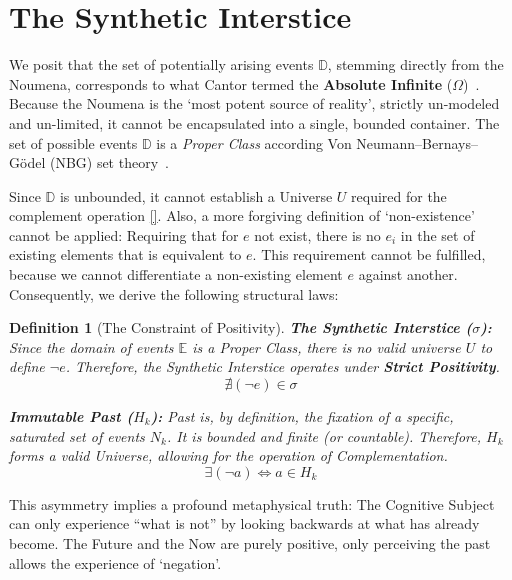 \documentclass[11pt, a4paper]{article}
\theoremstyle{formalism}
\newtheorem{formalism}{Definition}
\begin{document}
\section{The Synthetic Interstice}

We posit that the set of potentially arising events $\mathbb{D}$, stemming
directly from the Noumena, corresponds to what Cantor termed the
\textbf{Absolute Infinite} ($\Omega$)~\cite{Cantor1899}. Because the Noumena is
the `most potent source of reality', strictly un-modeled and un-limited, it
cannot be encapsulated into a single, bounded container. The set of possible
events $\mathbb{D}$ is a {\it Proper Class\/} according Von
Neumann–Bernays–Gödel (NBG) set theory~\cite{VonNeumann1925}.

Since $\mathbb{D}$ is unbounded, it cannot establish a Universe $U$ required
for the complement operation \eqref{}. Also, a more forgiving definition of
`non-existence' cannot be applied: Requiring that for $e$ not exist, there is
no $e_i$ in the set of existing elements that is equivalent to $e$. This
requirement cannot be fulfilled, because we cannot differentiate a non-existing
element $e$ against another. Consequently, we derive the following structural
laws:

\begin{formalism}[The Constraint of Positivity]
    \textbf{The Synthetic Interstice ($\sigma$):} 
    Since the domain of events $\mathbb{E}$ is a Proper Class, there is no valid 
    universe $U$ to define $\neg e$. Therefore, the Synthetic Interstice operates 
    under \textbf{Strict Positivity}.
    \begin{equation}
        \nexists (\neg e) \in \sigma
    \end{equation}
    
    \textbf{Immutable Past ($H_k$):} 
    Past is, by definition, the \textit{fixation} of a specific, saturated set 
    of events $N_k$. It is bounded and finite (or countable). Therefore, $H_k$ 
    forms a valid Universe, allowing for the operation of Complementation.
    \begin{equation}
        \exists (\neg a) \iff a \in H_k
    \end{equation}
\end{formalism}

This asymmetry implies a profound metaphysical truth: The Cognitive Subject can
only experience ``what is not'' by looking backwards at what has already
become. The Future and the Now are purely positive, only perceiving the past
allows the experience of `negation'.
\end{document}
